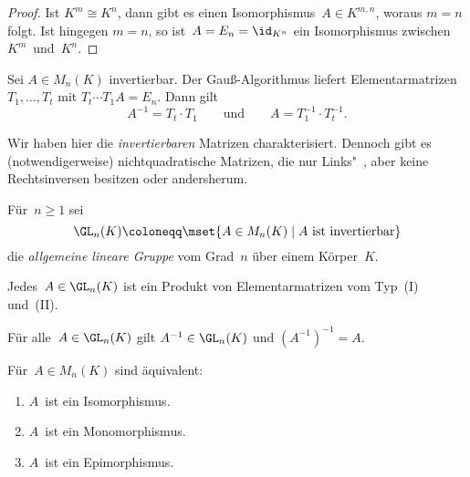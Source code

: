 \documentclass[a4paper]{article}
\begin{document}
\begin{proof}
    Ist $K^m \cong K^n$, dann gibt es einen Isomorphismus~$A \in K^{m,n}$, woraus $m = n$ folgt. Ist hingegen $m = n$, so ist~$A = E_n = \id_{K^n}$ ein Isomorphismus zwischen $K^m$~und~$K^n$.
\end{proof}

\begin{corollary}
    Sei $A \in M_n(K)$ invertierbar. Der Gauß-Algorithmus liefert Elementarmatrizen $T_1,\dots,T_t$ mit $T_t\cdots T_1A = E_n$. Dann gilt
    \begin{equation*}
        A^{-1} = T_t\cdot T_1 \qquad\text{und}\qquad A = T_1^{-1}\cdot T_t^{-1}.
    \end{equation*}
\end{corollary}

\begin{remark}
    Wir haben hier die \emph{invertierbaren} Matrizen charakterisiert. Dennoch gibt es (notwendigerweise) nichtquadratische Matrizen, die nur Links"~, aber keine Rechtsinversen besitzen oder andersherum.
\end{remark}

\begin{definition}
    Für~$n \geq 1$ sei
    \begin{equation*}
        \GL_n(K) \coloneqq \mset{A \in M_n(K) \mid A \text{ ist invertierbar}}
    \end{equation*}
    die \emph{allgemeine lineare Gruppe} vom Grad~$n$ über einem Körper~$K$.
\end{definition}

\begin{corollary}
    Jedes~$A \in \GL_n(K)$ ist ein Produkt von Elementarmatrizen vom Typ~(I) und~(II).
\end{corollary}

\begin{corollary}
    Für alle~$A \in \GL_n(K)$ gilt $A^{-1} \in \GL_n(K)$ und $(A^{-1})^{-1} = A$.
\end{corollary}

\begin{theorem}
    Für~$A \in M_n(K)$ sind äquivalent:
    \begin{enumerate}
        \item $A$~ist ein Isomorphismus.\label{thm:matrix:inverse:iso:1}
        \item $A$~ist ein Monomorphismus.\label{thm:matrix:inverse:iso:2}
        \item $A$~ist ein Epimorphismus.\label{thm:matrix:inverse:iso:3}
    \end{enumerate}
\end{theorem}
\end{document}
